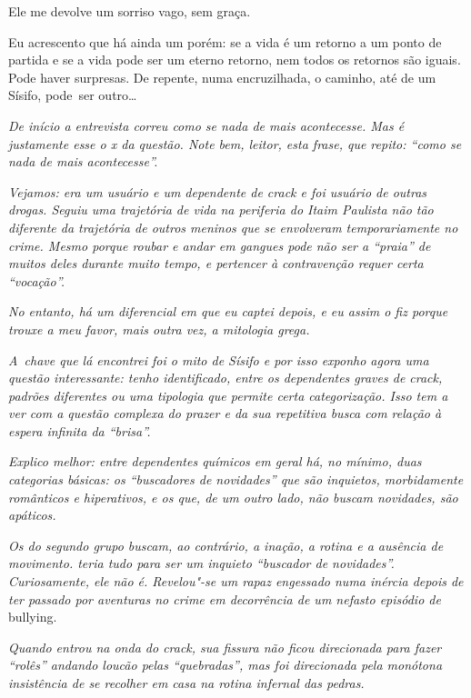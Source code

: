 Ele me devolve um sorriso vago, sem graça.

Eu acrescento que há ainda um porém: se a vida é um retorno a um ponto
de partida e se a vida pode ser um eterno retorno, nem todos os retornos
são iguais. Pode haver surpresas. De repente, numa encruzilhada, o
caminho, até de um Sísifo, pode~ser outro…

\begin{center}\asterisc{}\end{center}
\begingroup\small

\emph{De início a entrevista correu como se nada de mais acontecesse. Mas
é justamente esse o x da questão. Note bem, leitor, esta frase, que
repito: ``como se nada de mais acontecesse''.}

\emph{Vejamos:  era um usuário e um dependente de crack e foi usuário
de outras drogas. Seguiu uma trajetória de vida na periferia do Itaim
Paulista não tão diferente da trajetória de outros meninos que se
envolveram temporariamente no crime. Mesmo porque roubar e andar em
gangues pode não ser a ``praia'' de muitos deles durante muito tempo, e
pertencer à contravenção requer certa ``vocação''.}

\emph{No entanto, há um diferencial em  que eu captei depois, e eu
assim o fiz porque trouxe a meu favor, mais outra vez, a mitologia
grega.}

\emph{A~chave que lá encontrei foi o mito de Sísifo e por isso exponho
agora uma questão interessante: tenho identificado, entre os dependentes
graves de crack, padrões diferentes ou uma tipologia que permite certa
categorização. Isso tem a ver com a questão complexa do prazer e da sua
repetitiva busca com relação à espera infinita da ``brisa''.}

\emph{Explico melhor: entre dependentes químicos em geral há, no mínimo,
duas categorias básicas: os ``buscadores de novidades'' que são
inquietos, morbidamente românticos e hiperativos, e os que, de um outro
lado, não buscam novidades, são apáticos.}

\emph{Os do segundo grupo buscam, ao contrário, a inação, a rotina e a
ausência de movimento.  teria tudo para ser um inquieto ``buscador de
novidades''. Curiosamente, ele não é. Revelou"-se um rapaz engessado numa
inércia depois de ter passado por aventuras no crime em decorrência de
um nefasto episódio de} bullying.

\emph{Quando  entrou na onda do crack, sua fissura não ficou
direcionada para fazer ``rolês'' andando loucão pelas ``quebradas'', mas
foi direcionada pela monótona insistência de se recolher em casa na
rotina infernal das pedras.}

